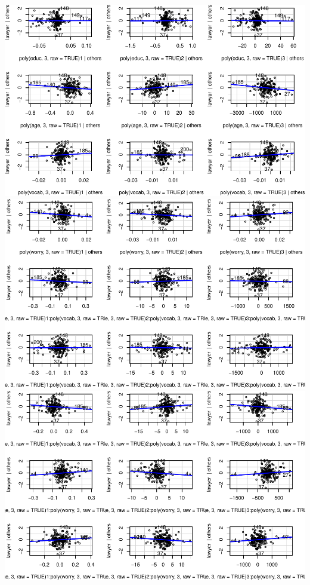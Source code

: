 \documentclass[
]{article}
\begin{document}
\includegraphics{HW5-Trinath-Sai-Subhash-Reddy-Pittala_files/figure-latex/unnamed-chunk-22-2.pdf}
\includegraphics{HW5-Trinath-Sai-Subhash-Reddy-Pittala_files/figure-latex/unnamed-chunk-22-3.pdf}
\includegraphics{HW5-Trinath-Sai-Subhash-Reddy-Pittala_files/figure-latex/unnamed-chunk-22-4.pdf}
\end{document}
